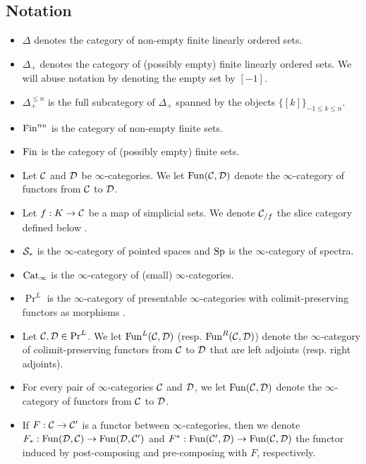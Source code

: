\subsection{Notation}
\begin{itemize}
	\item $\Delta$ denotes the category of non-empty finite linearly ordered sets.
	\item $\Delta_{+}$ denotes the category of (possibly empty) finite linearly ordered sets. We will abuse notation by denoting the empty set by $[-1]$.
	\item $\Delta^{\leq n}_{+}$ is the full subcategory of $\Delta_{+}$ spanned by the objects $\{[k]\}_{-1\leq k\leq n}$.
	\item $\operatorname{Fin}^{nu}$ is the category of non-empty finite sets.
	\item $\operatorname{Fin}$ is the category of (possibly empty) finite sets. 
	\item Let ${\mathcal{C}}$ and ${\mathcal{D}}$ be $\infty$-categories. We let $\operatorname{Fun}({\mathcal{C}},{\mathcal{D}})$ denote the $\infty$-category of functors from ${\mathcal{C}}$ to ${\mathcal{D}}$.
	\item Let $f:K \to {\mathcal{C}}$ be a map of simplicial sets.
	We denote ${\mathcal{C}}_{/f}$ the slice category defined below \cite[Proposition 1.2.9.2.]{HTT}.
	\item ${\mathcal{S}}_{*}$ is the $\infty$-category of pointed spaces and $\operatorname{Sp}$ is the $\infty$-category of spectra.
	\item $\operatorname{Cat}_{\infty}$ is the $\infty$-category of (small) $\infty$-categories.
	\item $\Pr^{L}$ is the $\infty$-category of presentable $\infty$-categories with colimit-preserving functors as morphisms \cite[Definition 5.5.3.1.]{HTT}.
	\item
    	Let ${\mathcal{C}},{\mathcal{D}} \in \Pr^L$. We let $\operatorname{Fun}^L({\mathcal{C}},{\mathcal{D}})$ (resp. $\operatorname{Fun}^{R}({\mathcal{C}}, {\mathcal{D}})$) denote  the $\infty$-category of colimit-preserving functors from ${\mathcal{C}}$ to ${\mathcal{D}}$ that are left adjoints (resp. right adjoints).
    	
    \item For every pair of $\infty$-categories ${\mathcal{C}}$ and ${\mathcal{D}}$, we let $\operatorname{Fun}({\mathcal{C}}, {\mathcal{D}})$ denote the $\infty$-category of functors from ${\mathcal{C}}$ to ${\mathcal{D}}$.
    
    \item If $F:{\mathcal{C}} \to {\mathcal{C}}'$ is a functor between $\infty$-categories, then we denote
    $F_*: \operatorname{Fun}({\mathcal{D}}, {\mathcal{C}}) \to \operatorname{Fun}({\mathcal{D}},{\mathcal{C}}')$ and $F^*: \operatorname{Fun}({\mathcal{C}}',{\mathcal{D}}) \to \operatorname{Fun}({\mathcal{C}}, {\mathcal{D}})$ the functor induced by post-composing and pre-composing with $F$, respectively.
    

\end{itemize}
